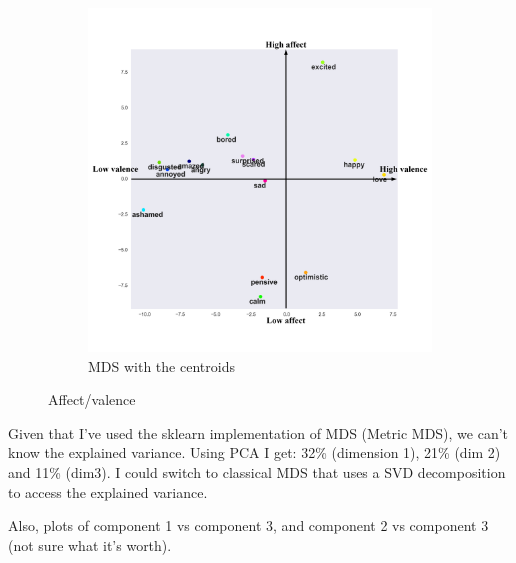 \documentclass{article} %
\begin{document}
\begin{figure}[H]
\begin{subfigure}[t]{.5\textwidth}
       \includegraphics[width=\linewidth]{Images/mds-center.jpg}
       \caption{MDS with the centroids}
    \end{subfigure}
    \caption{Affect/valence}
    \label{affect-valence}
\end{figure}

Given that I've used the sklearn implementation of MDS (Metric MDS), we can't know the explained variance. Using PCA I get: 32\% (dimension 1), 21\% (dim 2) and 11\% (dim3). I could switch to classical MDS that uses a SVD decomposition to access the explained variance.

Also, plots of component 1 vs component 3, and component 2 vs component 3 (not sure what it's worth).
\end{document}
